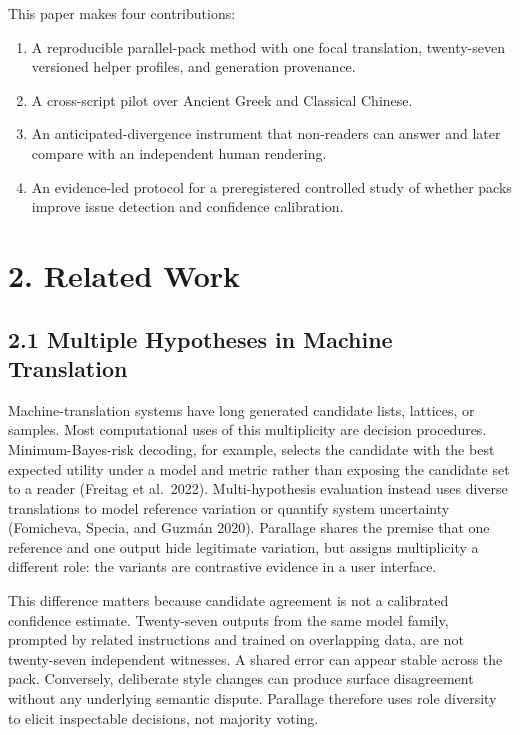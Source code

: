 \documentclass[
  12pt,
]{article}
\providecommand{\tightlist}{%
  \setlength{\itemsep}{0pt}\setlength{\parskip}{0pt}}
\begin{document}
This paper makes four contributions:

\begin{enumerate}
\def\labelenumi{\arabic{enumi}.}
\tightlist
\item
  A reproducible parallel-pack method with one focal translation,
  twenty-seven versioned helper profiles, and generation provenance.
\item
  A cross-script pilot over Ancient Greek and Classical Chinese.
\item
  An anticipated-divergence instrument that non-readers can answer and
  later compare with an independent human rendering.
\item
  An evidence-led protocol for a preregistered controlled study of
  whether packs improve issue detection and confidence calibration.
\end{enumerate}

\section{2. Related Work}\label{related-work}

\subsection{2.1 Multiple Hypotheses in Machine
Translation}\label{multiple-hypotheses-in-machine-translation}

Machine-translation systems have long generated candidate lists,
lattices, or samples. Most computational uses of this multiplicity are
decision procedures. Minimum-Bayes-risk decoding, for example, selects
the candidate with the best expected utility under a model and metric
rather than exposing the candidate set to a reader (Freitag et
al.~2022). Multi-hypothesis evaluation instead uses diverse translations
to model reference variation or quantify system uncertainty (Fomicheva,
Specia, and Guzmán 2020). Parallage shares the premise that one
reference and one output hide legitimate variation, but assigns
multiplicity a different role: the variants are contrastive evidence in
a user interface.

This difference matters because candidate agreement is not a calibrated
confidence estimate. Twenty-seven outputs from the same model family,
prompted by related instructions and trained on overlapping data, are
not twenty-seven independent witnesses. A shared error can appear stable
across the pack. Conversely, deliberate style changes can produce
surface disagreement without any underlying semantic dispute. Parallage
therefore uses role diversity to elicit inspectable decisions, not
majority voting.
\end{document}
